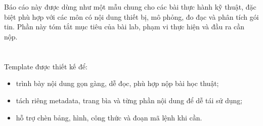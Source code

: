 \section{\sectionproblemtitle}
Báo cáo này được dùng như một mẫu chung cho các bài thực hành kỹ thuật, đặc biệt phù hợp với các môn có nội dung thiết bị, mô phỏng, đo đạc và phân tích gói tin. Phần này tóm tắt mục tiêu của bài lab, phạm vi thực hiện và đầu ra cần nộp.

\section{\sectionscopetitle}
Template được thiết kế để:
\begin{itemize}[leftmargin=2em]
    \item trình bày nội dung gọn gàng, dễ đọc, phù hợp nộp bài học thuật;
    \item tách riêng metadata, trang bìa và từng phần nội dung để dễ tái sử dụng;
    \item hỗ trợ chèn bảng, hình, công thức và đoạn mã lệnh khi cần.
\end{itemize}
